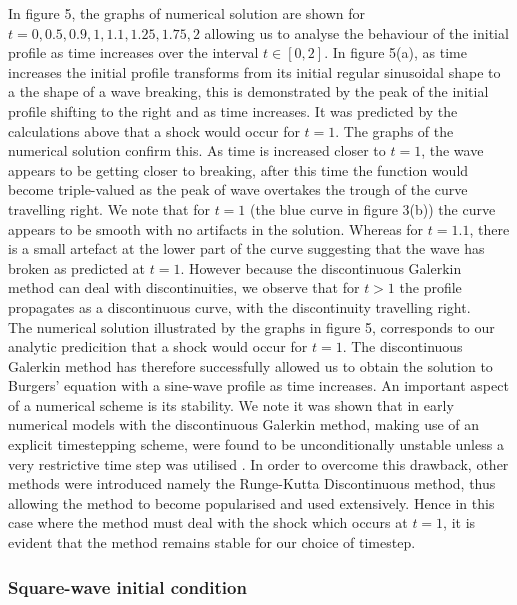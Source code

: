 \documentclass[a4paper, 12pt]{article}
\begin{document}
In figure 5, the graphs of numerical solution are shown for $t=0,0.5,0.9,1,1.1,1.25,1.75,2$ allowing us to analyse the behaviour of the initial profile as time increases over the interval $t\in[0,2]$. In figure 5(a), as time increases the initial profile transforms from its initial regular sinusoidal shape to a the shape of a wave breaking, this is demonstrated by the peak of the initial profile shifting to the right and as time increases. It was predicted by the calculations above that a shock would occur for $t=1$. The graphs of the numerical solution confirm this. As time is increased closer to $t=1$, the wave appears to be getting closer to breaking, after this time the function would become triple-valued as the peak of wave overtakes the trough of the curve travelling right. We note that for $t=1$ (the blue curve in figure 3(b)) the curve appears to be smooth with no artifacts in the solution. Whereas for $t=1.1$, there is a small artefact at the lower part of the curve suggesting that the wave has broken as predicted at $t=1$. However because the discontinuous Galerkin method can deal with discontinuities, we observe that for $t>1$ the profile propagates as a discontinuous curve, with the discontinuity travelling right. \\      

The numerical solution illustrated by the graphs in figure 5, corresponds to our analytic predicition that a shock would occur for $t=1$. The discontinuous Galerkin method has therefore successfully allowed us to obtain the solution to Burgers' equation with a sine-wave profile as time increases. An important aspect of a numerical scheme is its stability. We note it was shown that in early numerical models with the discontinuous Galerkin method, making use of an explicit timestepping scheme, were found to be unconditionally unstable unless a very restrictive time step was utilised \cite{LaiKhan2013}. In order to overcome this drawback, other methods were introduced namely the Runge-Kutta Discontinuous method, thus allowing the method to become popularised and used extensively. Hence in this case where the method must deal with the shock which occurs at $t=1$, it is evident that the method remains stable for our choice of timestep.\\    

\subsubsection{Square-wave initial condition}
\end{document}
